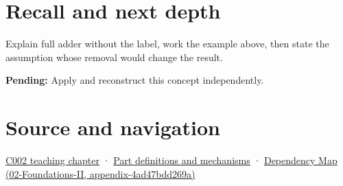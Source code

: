\section{Recall and next depth}\label{appendix-d1a5b1e520c2-recall-and-next-depth}

Explain full adder without the label, work the example above, then state the assumption whose removal would change the result.

\textbf{Pending:} Apply and reconstruct this concept independently.

\section{Source and navigation}\label{appendix-d1a5b1e520c2-source-and-navigation}

\href{Continuous\%20Notes/Computing\%20Foundations\%20-\%20From\%20Bits\%20to\%20C++\%20and\%20Systems\%20APIs\#Arithmetic\%20becomes\%20a\%20policy}{C002 teaching chapter} · \hyperref[appendix-fd090d982a15]{Part definitions and mechanisms} · \href{../02-Foundations-II/main.pdf\#nameddest=appendix-4ad47bdd269a}{Dependency Map (02-Foundations-II, appendix-4ad47bdd269a)}
